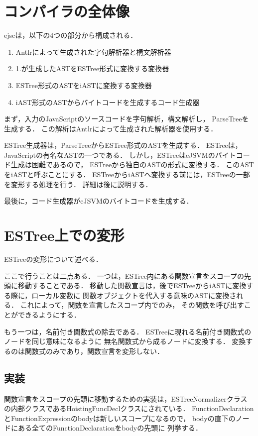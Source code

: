 \documentclass[a4j,12pt]{jarticle}
\begin{document}
\section{コンパイラの全体像}
ejscは，以下の4つの部分から構成される．
\begin{enumerate}
  \item Antlrによって生成された字句解析器と構文解析器
  \item 1.が生成したASTをESTree形式に変換する変換器
  \item ESTree形式のASTをiASTに変換する変換器
  \item iAST形式のASTからバイトコードを生成するコード生成器
\end{enumerate}

まず，入力のJavaScriptのソースコードを字句解析，構文解析し，
ParseTreeを生成する．
この解析はAntlrによって生成された解析器を使用する．

ESTree生成器は，ParseTreeからESTree形式のASTを生成する．
ESTreeは，JavaScriptの有名なASTの一つである．
しかし，ESTreeはeJSVMのバイトコード生成は困難であるので，
ESTreeから独自のASTの形式に変換する．
このASTをiASTと呼ぶことにする．
ESTreeからiASTへ変換する前には，ESTreeの一部を変形する処理を行う．
詳細は後に説明する．

最後に，コード生成器がeJSVMのバイトコードを生成する．


\section{ESTree上での変形}

ESTreeの変形について述べる．

ここで行うことは二点ある．
一つは，ESTree内にある関数宣言をスコープの先頭に移動することである．
移動した関数宣言は，後でESTreeからiASTに変換する際に，ローカル変数に
関数オブジェクトを代入する意味のASTに変換される．
これによって，関数を宣言したスコープ内でのみ，
その関数を呼び出すことができるようにする．

もう一つは，名前付き関数式の除去である．
ESTreeに現れる名前付き関数式のノードを同じ意味になるように
無名関数式から成るノードに変換する．
変換するのは関数式のみであり，関数宣言を変形しない．


\subsection{実装}

関数宣言をスコープの先頭に移動するための実装は，ESTreeNormalizerクラス
の内部クラスであるHoistingFuncDeclクラスにされている．
FunctionDeclarationとFunctionExpressionのbodyは新しいスコープになるので，
bodyの直下のノードにある全てのFunctionDeclarationをbodyの先頭に
列挙する．
\end{document}
